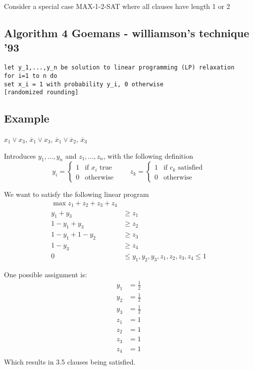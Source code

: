 \documentclass[english,12pt]{article}
\theoremstyle{plain}
\theoremstyle{definition}
\theoremstyle{definition} %
\begin{document}
Consider a special case MAX-1-2-SAT where all clauses have length 1 or 2
\subsection{Algorithm 4 Goemans - williamson's technique '93}
\begin{verbatim}
let y_1,...,y_n be solution to linear programming (LP) relaxation
for i=1 to n do
set x_i = 1 with probability y_i, 0 otherwise
[randomized rounding]
\end{verbatim}

\subsection{Example}
$x_1\vee x_3$, $\overline{x}_1\vee x_3$, $\overline{x}_1\vee \overline{x}_2$, $\overline{x}_3$

Introduces $y_1,\ldots, y_n$ and $z_1,\ldots, z_n$, with the following definition
\[y_i=
\begin{cases}
1 & \text{if }x_i \text{ true}\\
0 & \text{otherwise}
\end{cases}\qquad
z_k=
\begin{cases}
1 & \text{if }c_k \text{ satisfied}\\
0 & \text{otherwise}
\end{cases}\]

We want to satisfy the following linear program
\begin{align*}
\max z_1+z_2+z_3+z_4\\
y_1+y_3&\ge z_1\\
1-y_1+y_3&\ge z_2\\
1-y_1+1-y_2&\ge z_3\\
1-y_3&\ge z_4\\
0&\le y_1,y_2,y_3,z_1,z_2,z_3,z_4\le 1
\end{align*}

One possible assignment is:
\begin{align*}
y_1 &= \frac{1}{2}\\
y_2 &= \frac{1}{2}\\
y_3 &= \frac{1}{2}\\
z_1 &= 1\\
z_2 &= 1\\
z_3 &= 1\\
z_4 &= 1\\
\end{align*}
Which results in 3.5 clauses being satisfied.
\end{document}
